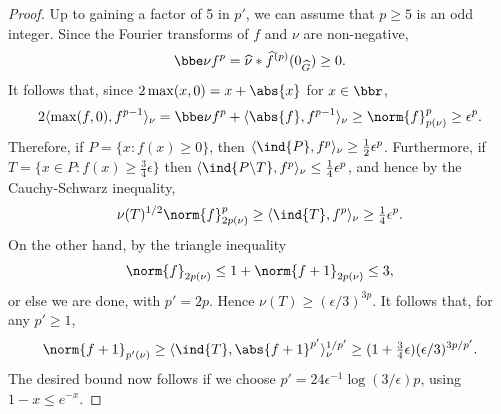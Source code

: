 \begin{proof}
\leanok
Up to gaining a factor of 5 in $p'$, we can assume that $p\geq 5$ is an odd integer. %
Since the Fourier transforms of $f$ and $\nu$ are non-negative,
\[\bbe \nu f^{p}= \widehat{\nu}\ast\widehat{f}^{(p)}(0_{\widehat{G}})\geq 0.\]
It follows that, since $2\max(x,0)=x+\abs{x}$ for $x\in\bbr$,
\[2\langle \max(f,0),f^{p-1}\rangle_\nu=\bbe \nu f^{p}+\langle \abs{f},f^{p-1}\rangle_\nu\geq \norm{f}_{p(\nu)}^p\geq \epsilon^p.\]
Therefore, if $P=\{ x : f(x) \geq 0\}$, then $\langle \ind{P},f^{p}\rangle_\nu\geq \frac{1}{2}\epsilon^{p}$. Furthermore, if $T=\{ x\in P : f(x) \geq \tfrac{3}{4}\epsilon\}$ then $\langle \ind{P\backslash T},f^p\rangle_\nu \leq \tfrac{1}{4}\epsilon^{p}$, and hence by the Cauchy-Schwarz inequality,
\[\nu(T)^{1/2}\norm{f}_{2p(\nu)}^{p}\geq \langle \ind{T}, f^{p}\rangle_\nu \geq \tfrac{1}{4}\epsilon^{p}.\]
On the other hand, by the triangle inequality
\[\norm{f}_{2p(\nu)}\leq 1+\norm{f+1}_{2p(\nu)}\leq 3,\]
or else we are done, with $p'=2p$. Hence $\nu(T)\geq (\epsilon/3)^{3p}$. It follows that, for any $p'\geq 1$,
\[\norm{f+1}_{p'(\nu)}\geq \langle \ind{T},\abs{f+1}^{p'}\rangle_\nu^{1/p'}\geq  (1+\tfrac{3}{4}\epsilon)(\epsilon/3)^{3p/p'}.\]
The desired bound now follows if we choose $p'=24\epsilon^{-1}\log(3/\epsilon)p$, using $1-x\leq e^{-x}$.
\end{proof}

